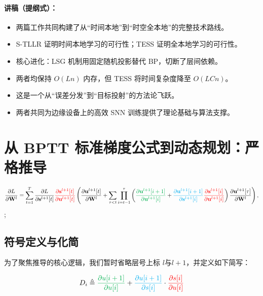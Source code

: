 \documentclass[journal,12pt,onecolumn]{IEEEtran}
\begin{document}
\paragraph{\textbf{讲稿（提纲式）：}}
\begin{itemize}
    \item 两篇工作共同构建了从“时间本地”到“时空全本地”的完整技术路线。
    \item S-TLLR 证明时间本地学习的可行性；TESS 证明全本地学习的可行性。
    \item 核心进化：LSG 机制用固定随机投影替代 BP，切断了层间依赖。
    \item 两者均保持 \(O(Ln)\) 内存，但 TESS 将时间复杂度降至 \(O(LCn)\)。
    \item 这是一个从“误差分发”到“目标投射”的方法论飞跃。
    \item 两者共同为边缘设备上的高效 SNN 训练提供了理论基础与算法支撑。
\end{itemize}

\section{从 BPTT 标准梯度公式到动态规划：严格推导}

\begin{equation}
\small
    \frac{\partial L}{\partial \mathbf{W}^l}=\sum_{t=1}^T \frac{\partial L}{\partial \mathbf{s}^{l+1}[t]}{\color{red}\frac{\partial \mathbf{s}^{l+1}[t]}{\partial \mathbf{u}^{l+1}[t]}}\left(\frac{\partial \mathbf{u}^{l+1}[t]}{\partial \mathbf{W}^l}+\sum_{\tau < t}\prod_{i=t-1}^{\tau}\left({\color[rgb]{0,0.69,0.31}\frac{\partial \mathbf{u}^{l+1}[i+1]}{\partial \mathbf{u}^{l+1}[i]}}+{\color{cyan}\frac{\partial \mathbf{u}^{l+1}[i+1]}{\partial \mathbf{s}^{l+1}[i]}}{\color{red}\frac{\partial \mathbf{s}^{l+1}[i]}{\partial \mathbf{u}^{l+1}[i]}}\right)\frac{\partial \mathbf{u}^{l+1}[\tau]}{\partial \mathbf{W}^l}\right),
    \label{bptt gradient}
\end{equation} \cite{xiao_online_2022};


\subsection{符号定义与化简}

为了聚焦推导的核心逻辑，我们暂时省略层号上标 \(l\)与\(l+1\)，并定义如下简写：

\begin{equation}
D_i \triangleq 
{\color[rgb]{0,0.69,0.31}{\frac{\partial u[i+1]}{\partial u[i]}}}
+
{\color{cyan}{\frac{\partial u[i+1]}{\partial s[i]}}}
\cdot
{\color{red}{\frac{\partial s[i]}{\partial u[i]}}}
\end{equation}
\end{document}
